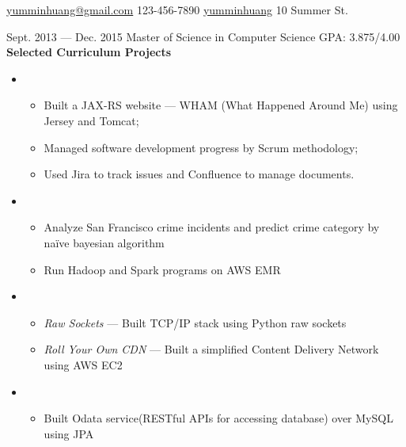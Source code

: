 \documentclass{newresume}
\begin{document}
{\href{mailto:yumminhuang@gmail.com}{yumminhuang@gmail.com}}
{123-456-7890}
{\href{https://github.com/yumminhuang}{yumminhuang}}
{10 Summer St.}


\begin{body}
	{Sept. 2013 --- Dec. 2015}
	{Master of Science in Computer Science}
	{GPA: 3.875/4.00}
	\textbf{Selected Curriculum Projects}
	\begin{itemize}
	\item {}
	\begin{itemize}
		\item Built a JAX-RS website --- WHAM (What Happened Around Me) using Jersey and Tomcat;
		\item Managed software development progress by Scrum methodology;
		\item Used Jira to track issues and Confluence to manage documents.
	\end{itemize}

	\item {}
	\begin{itemize}
		\item Analyze San Francisco crime incidents and predict crime category by na\"{i}ve bayesian algorithm
		\item Run Hadoop and Spark programs on AWS EMR
	\end{itemize}

	\item {}
	\begin{itemize}
		\item \textit{Raw Sockets} --- Built TCP/IP stack using Python raw sockets
		\item \textit{Roll Your Own CDN} --- Built a simplified Content Delivery Network using AWS EC2
	\end{itemize}

	\item {}
	\begin{itemize}
		\item Built Odata service(RESTful APIs for accessing database) over MySQL using JPA
	\end{itemize}

	\end{itemize}
\end{body}
\end{document}
